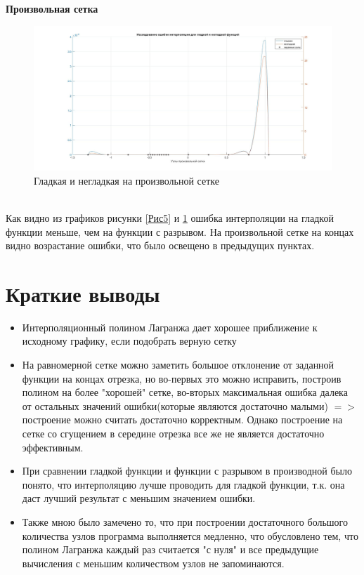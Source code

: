 \documentclass[a4paper]{article}
\begin{document}
\textbf{Произвольная сетка}
\begin{figure}[h!]
\begin{center}
\includegraphics[scale=0.3]{гладкая и негладкая произвольная.jpg} 
\end{center}
\caption{Гладкая и негладкая на произвольной сетке} \label{Рис6}
\end{figure}\\
Как видно из графиков рисунки \ref{Рис5}  и \ref{Рис6} ошибка интерполяции на гладкой функции меньше, чем на функции с разрывом. На произвольной сетке на концах видно возрастание ошибки, что было освещено в предыдущих пунктах.

\newpage
\section{Краткие выводы} 

\begin{itemize}
  \item Интерполяционный полином Лагранжа дает хорошее приближение к исходному графику, если подобрать верную сетку 
  \item На равномерной сетке можно заметить большое отклонение от заданной функции на концах отрезка, но во-первых это можно исправить, построив полином на более "хорошей" сетке, во-вторых максимальная ошибка далека от остальных значений ошибки(которые являются достаточно малыми) $=>$ построение можно считать достаточно корректным. Однако построение на сетке со сгущением в середине отрезка все же не является достаточно эффективным.
  \item При сравнении гладкой функции и функции с разрывом в производной было понято, что интерполяцию лучше проводить для гладкой функции, т.к. она даст лучший результат с меньшим значением ошибки.
  \item Также мною было замечено то, что при построении достаточного большого количества узлов программа выполняется медленно, что обусловлено тем, что полином Лагранжа каждый раз считается "с нуля" и все предыдущие вычисления с меньшим количеством узлов не запоминаются.
   
\end{itemize}
\end{document}
